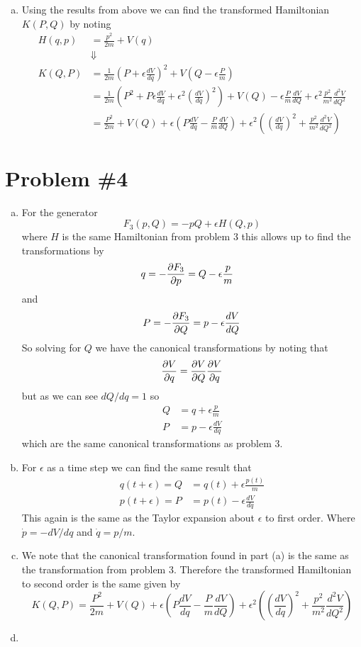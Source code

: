 \documentclass[11pt]{article}
\numberwithin{equation}{section}
\begin{document}
\begin{enumerate}[(a)]
\item Using the results from above we can find the transformed Hamiltonian $K(P,Q)$ by noting
\begin{align*}
H(q,p) &= \frac{p^2}{2m} + V(q)\\
&\Downarrow\\
K(Q,P) &= \frac{1}{2m}\left(P+\epsilon\frac{dV}{dq}\right)^2 + V\left(Q-\epsilon\frac{P}{m}\right)\\
&= \frac{1}{2m}\left(P^2+P\epsilon\frac{dV}{dq}+\epsilon^2\left(\frac{dV}{dq}\right)^2\right) + V(Q) - \epsilon\frac{P}{m}\frac{dV}{dQ} + \epsilon^2\frac{p^2}{m^2}\frac{d^2V}{dQ^2}\\
&= \frac{P^2}{2m} + V(Q) + \epsilon\left(P\frac{dV}{dq}-\frac{P}{m}\frac{dV}{dQ}\right) + \epsilon^2\left(\left(\frac{dV}{dq}\right)^2 + \frac{p^2}{m^2}\frac{d^2V}{dQ^2}\right)
\end{align*}
\end{enumerate}

\pagebreak

\section{Problem \#4}
\begin{enumerate}[(a)]
\item For the generator 
$$F_3(p,Q) = -pQ + \epsilon{H(Q,p)}$$
where $H$ is the same Hamiltonian from problem 3 this allows up to find the transformations 
by
\begin{align*}
q = -\frac{\partial{F_3}}{\partial{p}} &= Q - \epsilon\frac{p}{m}
\end{align*}
and 
$$P = -\frac{\partial{F_3}}{\partial{Q}} = p - \epsilon\frac{dV}{dQ}$$
So solving for $Q$ we have the canonical transformations by noting that
$$\frac{\partial{V}}{\partial{q}} = \frac{\partial{V}}{\partial{Q}}\frac{\partial{V}}{\partial{q}}$$
but as we can see $dQ/dq =1$ so
\begin{align*}
Q &= q + \epsilon\frac{p}{m}\\
P &= p - \epsilon\frac{dV}{dq}
\end{align*}
which are the same canonical transformations as problem 3.

\item For $\epsilon$ as a time step we can find the same result that
\begin{align*}
q(t+\epsilon) = Q &= q(t) + \epsilon\frac{p(t)}{m}\\
p(t+\epsilon) = P &= p(t) - \epsilon\frac{dV}{dq}
\end{align*}
This again is the same as the Taylor expansion about $\epsilon$ to first order. Where 
$\dot{p} = -dV/dq$ and $\dot{q} = p/m$.

\item We note that the canonical transformation found in part (a) is the same as the 
transformation from problem 3. Therefore the transformed Hamiltonian to second order is the
same given by
$$K(Q,P) = \frac{P^2}{2m} + V(Q) + \epsilon\left(P\frac{dV}{dq}-\frac{P}{m}\frac{dV}{dQ}\right) + \epsilon^2\left(\left(\frac{dV}{dq}\right)^2 + \frac{p^2}{m^2}\frac{d^2V}{dQ^2}\right)$$

\item
\end{enumerate}
\end{document}
